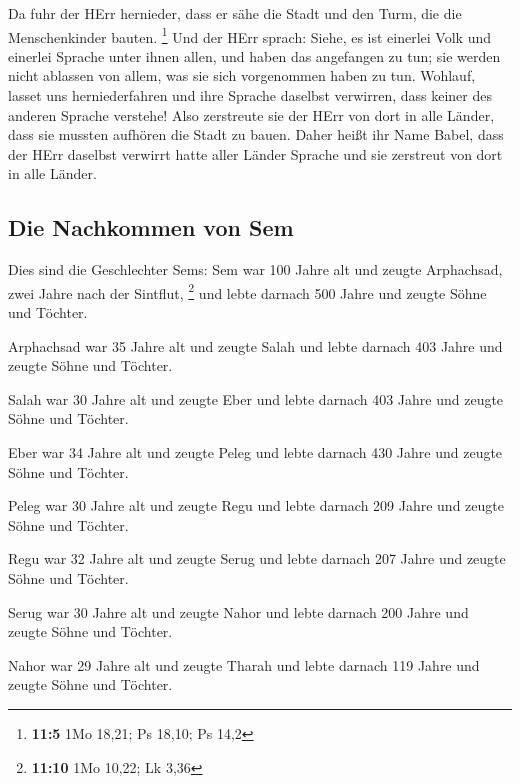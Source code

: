  Da fuhr der HErr hernieder, dass er sähe die Stadt und
den Turm, die die Menschenkinder bauten. \footnote{\textbf{11:5} 1Mo
  18,21; Ps 18,10; Ps 14,2}  Und der HErr sprach: Siehe,
es ist einerlei Volk und einerlei Sprache unter ihnen allen, und haben
das angefangen zu tun; sie werden nicht ablassen von allem, was sie sich
vorgenommen haben zu tun.  Wohlauf, lasset uns
herniederfahren und ihre Sprache daselbst verwirren, dass keiner des
anderen Sprache verstehe!  Also zerstreute sie der HErr
von dort in alle Länder, dass sie mussten aufhören die Stadt zu bauen.
 Daher heißt ihr Name Babel, dass der HErr daselbst
verwirrt hatte aller Länder Sprache und sie zerstreut von dort in alle
Länder.

\hypertarget{die-nachkommen-von-sem}{%
\subsection{Die Nachkommen von Sem}\label{die-nachkommen-von-sem}}

 Dies sind die Geschlechter Sems: Sem war 100 Jahre alt
und zeugte Arphachsad, zwei Jahre nach der Sintflut, \footnote{\textbf{11:10}
  1Mo 10,22; Lk 3,36}  und lebte darnach 500 Jahre und
zeugte Söhne und Töchter.

 Arphachsad war 35 Jahre alt und zeugte Salah
 und lebte darnach 403 Jahre und zeugte Söhne und
Töchter.

 Salah war 30 Jahre alt und zeugte Eber 
und lebte darnach 403 Jahre und zeugte Söhne und Töchter.

 Eber war 34 Jahre alt und zeugte Peleg 
und lebte darnach 430 Jahre und zeugte Söhne und Töchter.

 Peleg war 30 Jahre alt und zeugte Regu 
und lebte darnach 209 Jahre und zeugte Söhne und Töchter.

 Regu war 32 Jahre alt und zeugte Serug 
und lebte darnach 207 Jahre und zeugte Söhne und Töchter.

 Serug war 30 Jahre alt und zeugte Nahor 
und lebte darnach 200 Jahre und zeugte Söhne und Töchter.

 Nahor war 29 Jahre alt und zeugte Tharah 
und lebte darnach 119 Jahre und zeugte Söhne und Töchter.

